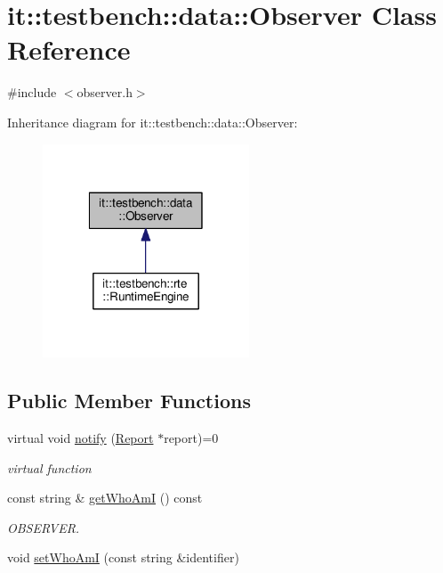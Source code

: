 \hypertarget{classit_1_1testbench_1_1data_1_1Observer}{\section{it\-:\-:testbench\-:\-:data\-:\-:Observer Class Reference}
\label{d6/dae/classit_1_1testbench_1_1data_1_1Observer}
}


{\ttfamily \#include $<$observer.\-h$>$}



Inheritance diagram for it\-:\-:testbench\-:\-:data\-:\-:Observer\-:
\nopagebreak
\begin{figure}[H]
\begin{center}
\leavevmode
\includegraphics[width=174pt]{d9/db1/classit_1_1testbench_1_1data_1_1Observer__inherit__graph}
\end{center}
\end{figure}
\subsection*{Public Member Functions}
\begin{DoxyCompactItemize}
\item 
virtual void \hyperlink{classit_1_1testbench_1_1data_1_1Observer_a6658bb092e485bfe9edb7a9f27685a27}{notify} (\hyperlink{classit_1_1testbench_1_1data_1_1Report}{Report} $\ast$report)=0
\begin{DoxyCompactList}\small\item\em virtual function \end{DoxyCompactList}\item 
const string \& \hyperlink{classit_1_1testbench_1_1data_1_1Observer_aab491d48bf9f40d68dba5825bbe7041e}{get\-Who\-Am\-I} () const 
\begin{DoxyCompactList}\small\item\em O\-B\-S\-E\-R\-V\-E\-R. \end{DoxyCompactList}\item 
void \hyperlink{classit_1_1testbench_1_1data_1_1Observer_a997023b49c0c638593141b068ff2b68d}{set\-Who\-Am\-I} (const string \&identifier)
\end{DoxyCompactItemize}

